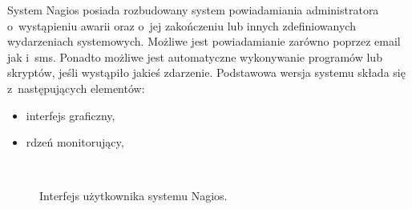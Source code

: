 System Nagios posiada rozbudowany system powiadamiania administratora
o~wystąpieniu awarii oraz o~jej zakończeniu lub innych zdefiniowanych
wydarzeniach systemowych. Możliwe jest powiadamianie zarówno poprzez
email jak i~sms. Ponadto możliwe jest automatyczne wykonywanie
programów lub skryptów, jeśli wystąpiło jakieś zdarzenie. Podstawowa
wersja systemu składa się z~następujących elementów:

\begin{itemize}
\item interfejs graficzny,
\item rdzeń monitorujący,
\end{itemize}

\begin{figure}[h]
\label{fig:NagiosInterface}
\caption{Interfejs użytkownika systemu Nagios.}
\begin{center}
\\[0.1cm]
\end{center}
\end{figure}

